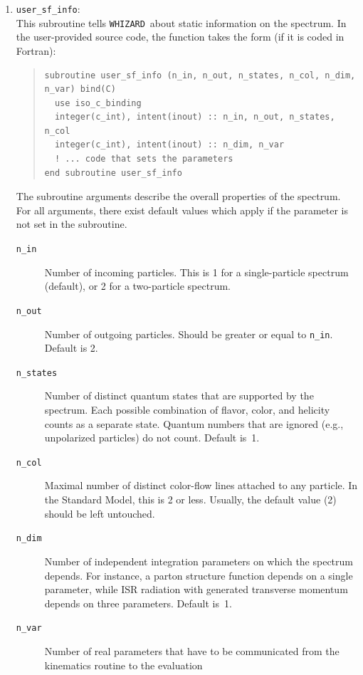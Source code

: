 \documentclass[12pt]{book}
\newcommand{\ttt}[1]{\texttt{#1}}
\newcommand{\whizard}{\texttt{WHIZARD}}
\begin{document}
\begin{enumerate}
\item \ttt{user\_sf\_info}:\\
  This subroutine tells \whizard\ about static information on the
  spectrum.  In the user-provided source code, the function takes the
  form (if it is coded in Fortran):
  \begin{quote}
  \begin{footnotesize}
\begin{verbatim}
subroutine user_sf_info (n_in, n_out, n_states, n_col, n_dim, n_var) bind(C)
  use iso_c_binding
  integer(c_int), intent(inout) :: n_in, n_out, n_states, n_col
  integer(c_int), intent(inout) :: n_dim, n_var
  ! ... code that sets the parameters
end subroutine user_sf_info
\end{verbatim}
  \end{footnotesize}
  \end{quote}
  The subroutine arguments describe the
  overall properties of the spectrum.  For all arguments, there exist
  default values which apply if the parameter is not set in the subroutine.
  \begin{description}
  \item[\ttt{n\_in}]  Number of incoming particles.  This is 1 for a
    single-particle spectrum (default), or 2 for a two-particle
    spectrum.
  \item[\ttt{n\_out}]  Number of outgoing particles.  Should be
    greater or equal to \ttt{n\_in}.  Default is 2.
  \item[\ttt{n\_states}]  Number of distinct quantum states that are
    supported by the spectrum.  Each possible combination of flavor,
    color, and helicity counts as a separate state.  Quantum numbers
    that are ignored (e.g., unpolarized particles) do not count.
    Default is~1.
  \item[\ttt{n\_col}]  Maximal number of distinct color-flow lines
    attached to any particle.  In the Standard Model, this is 2 or less.
    Usually, the default value (2) should be left untouched.
  \item[\ttt{n\_dim}]  Number of independent integration parameters on
    which the spectrum depends.  For instance, a parton structure
    function depends on a single parameter, while ISR radiation with
    generated transverse momentum depends on three parameters.
    Default is~1.
  \item[\ttt{n\_var}]  Number of real parameters that have to be
    communicated from the kinematics routine to the evaluation

\end{description}
\end{enumerate}
\end{document}
